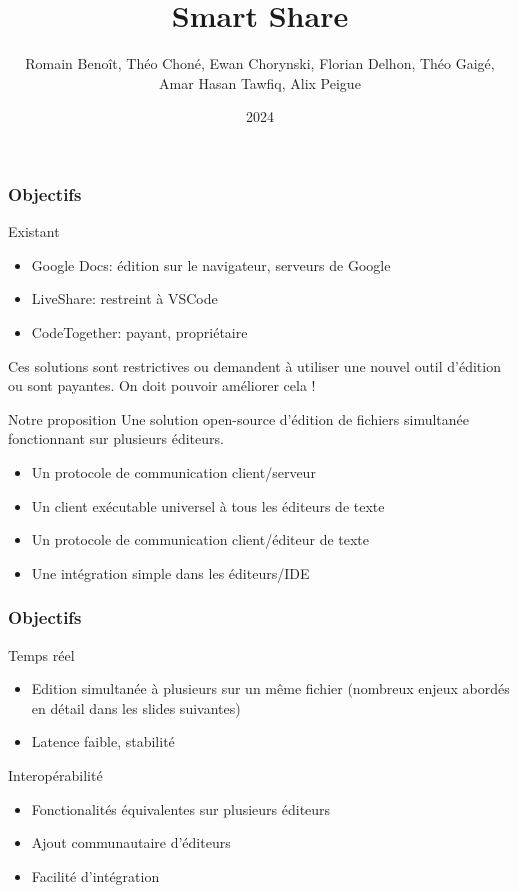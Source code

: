 \documentclass{beamer}
\title[Smart Share]{Smart Share}
\author[Blazanome]{Romain Benoît, Théo Choné, Ewan Chorynski, Florian Delhon, Théo Gaigé, Amar Hasan Tawfiq, Alix Peigue}
\institute[INSA Lyon]{INSA Lyon}
\date{2024}
\begin{document}
\frame{\titlepage}

\begin{frame}
    \frametitle{Objectifs}
    \begin{block}{Existant}
        \begin{itemize}
            \item Google Docs: édition sur le navigateur, serveurs de Google
            \item LiveShare: restreint à VSCode
            \item CodeTogether: payant, propriétaire
        \end{itemize}
        Ces solutions sont restrictives ou demandent à utiliser une nouvel outil d'édition ou sont payantes.
        On doit pouvoir améliorer cela !
    \end{block}
    \begin{block}{Notre proposition}
        Une solution open-source d'édition de fichiers simultanée fonctionnant sur plusieurs éditeurs.
        \begin{itemize}
            \item Un protocole de communication client/serveur
            \item Un client exécutable universel à tous les éditeurs de texte
            \item Un protocole de communication client/éditeur de texte
            \item Une intégration simple dans les éditeurs/IDE
        \end{itemize}
    \end{block}
\end{frame}

\begin{frame}
    \frametitle{Objectifs}
    \begin{block}{Temps réel}
        \begin{itemize}
            \item Edition simultanée à plusieurs sur un même fichier (nombreux enjeux abordés en détail dans les slides suivantes)
            \item Latence faible, stabilité
        \end{itemize}
    \end{block}
    \begin{block}{Interopérabilité}
        \begin{itemize}
            \item Fonctionalités équivalentes sur plusieurs éditeurs
            \item Ajout communautaire d'éditeurs
            \item Facilité d'intégration
        \end{itemize}
    \end{block}
\end{frame}
\end{document}
